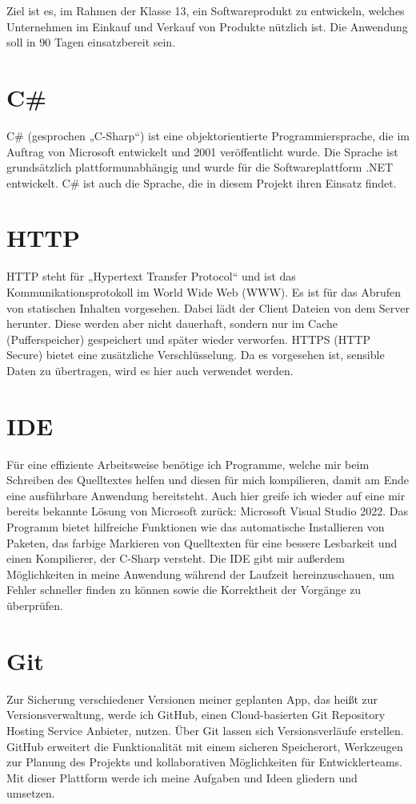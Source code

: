 Ziel ist es, im Rahmen der Klasse 13, ein Softwareprodukt zu entwickeln, welches Unternehmen im Einkauf und Verkauf von Produkte nützlich ist. Die Anwendung soll in 90 Tagen einsatzbereit sein.

\section{C\#}
C\# (gesprochen „C-Sharp“) ist eine objektorientierte Programmiersprache, die im Auftrag von Microsoft entwickelt und 2001 veröffentlicht wurde. Die Sprache ist grundsätzlich plattformunabhängig und wurde für die Softwareplattform .NET entwickelt. C\# ist auch die Sprache, die in diesem Projekt ihren Einsatz findet.

\section{HTTP}
HTTP steht für „Hypertext Transfer Protocol“ und ist das Kommunikationsprotokoll im World Wide Web (WWW). Es ist für das Abrufen von statischen Inhalten vorgesehen. Dabei lädt der Client Dateien von dem Server herunter. Diese werden aber nicht dauerhaft, sondern nur im Cache (Pufferspeicher) gespeichert und später wieder verworfen. HTTPS (HTTP Secure) bietet eine zusätzliche Verschlüsselung. Da es vorgesehen ist, sensible Daten zu übertragen, wird es hier auch verwendet werden.

\section{IDE}
Für eine effiziente Arbeitsweise benötige ich Programme, welche mir beim Schreiben des Quelltextes helfen und diesen für mich kompilieren, damit am Ende eine ausführbare Anwendung bereitsteht. Auch hier greife ich wieder auf eine mir bereits bekannte Lösung von Microsoft zurück: Microsoft Visual Studio 2022. Das Programm bietet hilfreiche Funktionen wie das automatische Installieren von Paketen, das farbige Markieren von Quelltexten für eine bessere Lesbarkeit und einen Kompilierer, der C-Sharp versteht. Die IDE gibt mir außerdem Möglichkeiten in meine Anwendung während der Laufzeit hereinzuschauen, um Fehler schneller finden zu können sowie die Korrektheit der Vorgänge zu überprüfen.

\section{Git}
Zur Sicherung verschiedener Versionen meiner geplanten App, das heißt zur Versionsverwaltung, werde ich GitHub, einen Cloud-basierten Git Repository Hosting Service Anbieter, nutzen. Über Git lassen sich Versionsverläufe erstellen. GitHub erweitert die Funktionalität mit einem sicheren Speicherort, Werkzeugen zur Planung des Projekts und kollaborativen Möglichkeiten für Entwicklerteams. Mit dieser Plattform werde ich meine Aufgaben und Ideen gliedern und umsetzen.